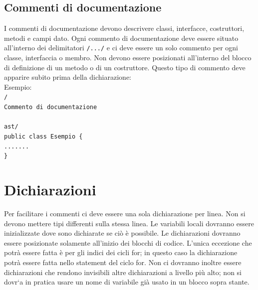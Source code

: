 \documentclass[11pt,titlepage,a4paper]{report}
\begin{document}
\section{Commenti di documentazione}
I commenti di documentazione devono descrivere classi, interfacce, costruttori, metodi e campi dato. Ogni commento di documentazione deve essere situato all'interno dei delimitatori \texttt{/\ast\ast...\ast/} e ci deve essere un solo commento per ogni classe, interfaccia o membro. Non devono essere posizionati all'interno del blocco di definizione di un metodo o di un costruttore. Questo tipo di commento deve apparire subito prima della dichiarazione:\\
 \newline
Esempio:\\
 \newline
\texttt{/\ast\ast \\
\ast Commento di documentazione \\
\\ast/ \\
public class Esempio \{ \\
    ....... \\
\}} \\
 \newline
\chapter{Dichiarazioni}
Per facilitare i commenti ci deve essere una sola dichiarazione per linea. Non si devono mettere tipi differenti sulla stessa linea. Le variabili locali dovranno essere inizializzate dove sono dichiarate se ci\`o \`e possibile. Le dichiarazioni dovranno essere posizionate solamente all'inizio dei blocchi di codice. L'unica eccezione che potr\`a essere fatta è per gli indici dei cicli for; in questo caso la dichiarazione potr\`a essere fatta nello statement del ciclo for. Non ci dovranno inoltre essere dichiarazioni che rendono invisibili altre dichiarazioni a livello più alto; non si dovr`a in pratica usare un nome di variabile già usato in un blocco sopra stante.
\end{document}
